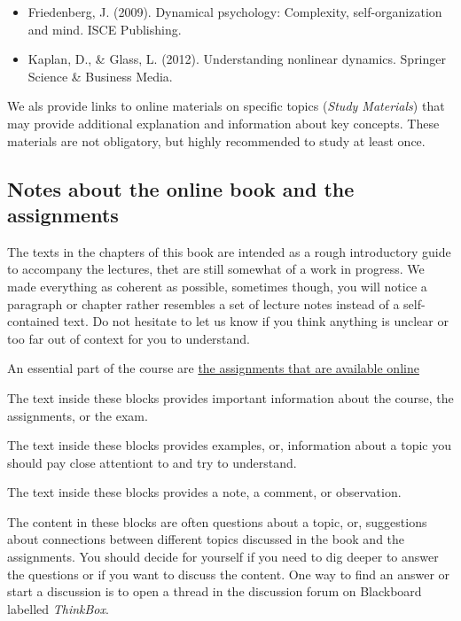 \documentclass[12pt,]{book}
\providecommand{\tightlist}{%
  \setlength{\itemsep}{0pt}\setlength{\parskip}{0pt}}
\let\BeginKnitrBlock\begin \let\EndKnitrBlock\end
\begin{document}
\begin{itemize}
\tightlist
\item
  Friedenberg, J. (2009). Dynamical psychology: Complexity, self-organization and mind. ISCE Publishing.
\item
  Kaplan, D., \& Glass, L. (2012). Understanding nonlinear dynamics. Springer Science \& Business Media.
\end{itemize}

We als provide links to online materials on specific topics (\emph{Study Materials}) that may provide additional explanation and information about key concepts. These materials are not obligatory, but highly recommended to study at least once.

\hypertarget{notes-about-the-online-book-and-the-assignments}{%
\subsection*{Notes about the online book and the assignments}\label{notes-about-the-online-book-and-the-assignments}}

The texts in the chapters of this book are intended as a rough introductory guide to accompany the lectures, thet are still somewhat of a work in progress. We made everything as coherent as possible, sometimes though, you will notice a paragraph or chapter rather resembles a set of lecture notes instead of a self-contained text. Do not hesitate to let us know if you think anything is unclear or too far out of context for you to understand.

An essential part of the course are \href{https://darwin.pwo.ru.nl/skunkworks/courseware/1718_DCS/assignments/}{the assignments that are available online}

\BeginKnitrBlock{rmdimportant}
The text inside these blocks provides important information about the course, the assignments, or the exam.
\EndKnitrBlock{rmdimportant}

\BeginKnitrBlock{rmdkennen}
The text inside these blocks provides examples, or, information about a topic you should pay close attentiont to and try to understand.
\EndKnitrBlock{rmdkennen}

\BeginKnitrBlock{rmdnote}
The text inside these blocks provides a note, a comment, or observation.
\EndKnitrBlock{rmdnote}

\BeginKnitrBlock{rmdselfThink}
The content in these blocks are often questions about a topic, or, suggestions about connections between different topics discussed in the book and the assignments. You should decide for yourself if you need to dig deeper to answer the questions or if you want to discuss the content. One way to find an answer or start a discussion is to open a thread in the discussion forum on Blackboard labelled \emph{ThinkBox}.
\EndKnitrBlock{rmdselfThink}
\end{document}
